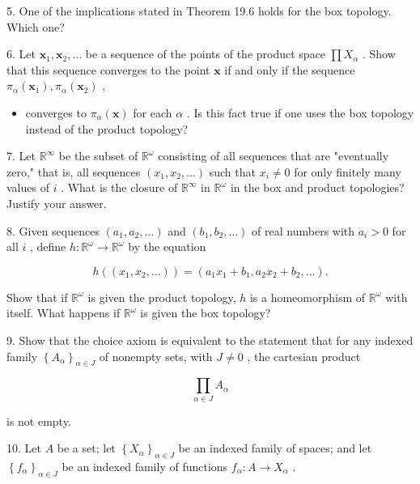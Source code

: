 5. One of the implications stated in Theorem 19.6 holds for the box topology. Which one?

6. Let \({\mathbf{x}}_{1},{\mathbf{x}}_{2},\ldots\) be a sequence of the points of the product space \(\prod {X}_{\alpha }\) . Show that this sequence converges to the point \(\mathbf{x}\) if and only if the sequence \({\pi }_{\alpha }\left( {\mathbf{x}}_{1}\right) ,{\pi }_{\alpha }\left( {\mathbf{x}}_{2}\right)\) ,

\begin{itemize}
\item converges to \({\pi }_{\alpha }\left( \mathbf{x}\right)\) for each \(\alpha\) . Is this fact true if one uses the box topology instead of the product topology?
\end{itemize}

7. Let \({\mathbb{R}}^{\infty }\) be the subset of \({\mathbb{R}}^{\omega }\) consisting of all sequences that are "eventually zero," that is, all sequences \(\left( {{x}_{1},{x}_{2},\ldots }\right)\) such that \({x}_{i} \neq  0\) for only finitely many values of \(i\) . What is the closure of \({\mathbb{R}}^{\infty }\) in \({\mathbb{R}}^{\omega }\) in the box and product topologies? Justify your answer.

8. Given sequences \(\left( {{a}_{1},{a}_{2},\ldots }\right)\) and \(\left( {{b}_{1},{b}_{2},\ldots }\right)\) of real numbers with \({a}_{i} > 0\) for all \(i\) , define \(h : {\mathbb{R}}^{\omega } \rightarrow  {\mathbb{R}}^{\omega }\) by the equation

\[
h\left( \left( {{x}_{1},{x}_{2},\ldots }\right) \right)  = \left( {{a}_{1}{x}_{1} + {b}_{1},{a}_{2}{x}_{2} + {b}_{2},\ldots }\right) .
\]

Show that if \({\mathbb{R}}^{\omega }\) is given the product topology, \(h\) is a homeomorphism of \({\mathbb{R}}^{\omega }\) with itself. What happens if \({\mathbb{R}}^{\omega }\) is given the box topology?

9. Show that the choice axiom is equivalent to the statement that for any indexed family \({\left\{  {A}_{\alpha }\right\}  }_{\alpha  \in  J}\) of nonempty sets, with \(J \neq  0\) , the cartesian product

\[
\mathop{\prod }\limits_{{\alpha  \in  J}}{A}_{\alpha }
\]

is not empty.

10. Let \(A\) be a set; let \({\left\{  {X}_{\alpha }\right\}  }_{\alpha  \in  J}\) be an indexed family of spaces; and let \({\left\{  {f}_{\alpha }\right\}  }_{\alpha  \in  J}\) be an indexed family of functions \({f}_{\alpha } : A \rightarrow  {X}_{\alpha }\) .

